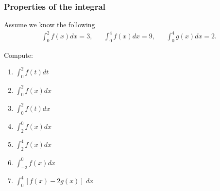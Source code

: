 \documentclass[14pt]{beamer}
\newcommand{\setsize}[1]{\fontsize{#1}{#1}\selectfont} %
\newcommand{\smallerfont}{\setsize{13}} %
\begin{document}
	\begin{frame}
		\smallerfont
		\frametitle{Properties of the integral}

		Assume we know the following
		\begin{align*}
			 & \int_{0}^{2} f(x) dx = 3, &  & \int_{0}^{4} f(x) dx = 9, &  & \int_{0}^{4} g(x) dx = 2.
		\end{align*}

		Compute:
		\begin{multicols}{2}
			\begin{enumerate}
				\item ${\displaystyle \int_0^2 f(t) dt}$

				\item ${\displaystyle \int_0^2 f(x) dx}$

				\item ${\displaystyle \int_0^2 f(t) dx}$

				\item ${\displaystyle \int_2^0 f(x) dx}$

				\item ${\displaystyle \int_2^4 f(x) dx}$

				\item ${\displaystyle \int_{-2}^{0} f(x) dx}$

				\item ${\displaystyle \int_0^4 \left[ f(x) - 2g(x) \right] \; dx}$
			\end{enumerate}
		\end{multicols}
		\vfill
	\end{frame}
\end{document}
